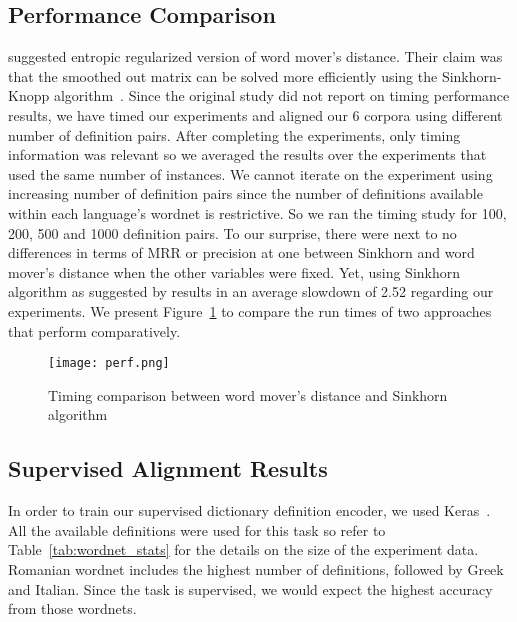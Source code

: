 \subsection{Performance Comparison}%
\label{sub:performance_comparison}

\textcite{balikasCrosslingual2018} suggested entropic regularized version of word mover's distance.
Their claim was that the smoothed out matrix can be solved more efficiently using the Sinkhorn-Knopp algorithm~\cite{sinkhorn_concerning_1967}.
Since the original study did not report on timing performance results, we have timed our experiments and aligned our 6 corpora using different number of definition pairs.
After completing the experiments, only timing information was relevant so we averaged the results over the experiments that used the same number of instances.
We cannot iterate on the experiment using increasing number of definition pairs since the number of definitions available within each language's wordnet is restrictive.
So we ran the timing study for 100, 200, 500 and 1000 definition pairs.
To our surprise, there were next to no differences in terms of MRR or precision at one between Sinkhorn and word mover's distance when the other variables were fixed.
Yet, using Sinkhorn algorithm as suggested by \citeauthor{balikasCrosslingual2018} results in an average slowdown of 2.52 regarding our experiments.
We present Figure~\ref{fig:perf} to compare the run times of two approaches that perform comparatively.

\begin{figure}[htpb]
    \centering
    \texttt{[image: perf.png]}
    \caption{Timing comparison between word mover's distance and Sinkhorn algorithm}%
    \label{fig:perf}
\end{figure}

\subsection{Supervised Alignment Results}%
\label{sec:supervised_encoding_results}

In order to train our supervised dictionary definition encoder, we used Keras~\cite{chollet_keras_2015}.
All the available definitions were used for this task so refer to Table~\ref{tab:wordnet_stats} for the details on the size of the experiment data.
Romanian wordnet includes the highest number of definitions, followed by Greek and Italian.
Since the task is supervised, we would expect the highest accuracy from those wordnets.

